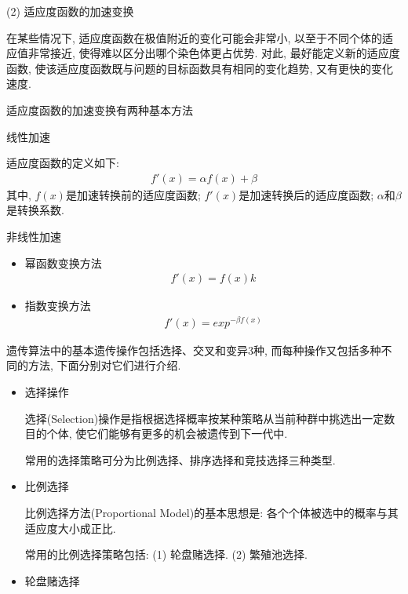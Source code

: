{(2) 适应度函数的加速变换

在某些情况下, 适应度函数在极值附近的变化可能会非常小, 以至于不同个体的适应值非常接近, 使得难以区分出哪个染色体更占优势. 对此, 最好能定义新的适应度函数, 使该适应度函数既与问题的目标函数具有相同的变化趋势, 又有更快的变化速度.

适应度函数的加速变换有两种基本方法

 线性加速

适应度函数的定义如下:
\begin{align}
  f'(x)=\alpha f(x)+\beta
\end{align}
其中, $f(x)$是加速转换前的适应度函数; $f'(x)$是加速转换后的适应度函数;  $\alpha$和$\beta$是转换系数.

  非线性加速
\begin{itemize}
\item 幂函数变换方法
   \begin{align}
        f'(x)=f(x)k
   \end{align}
\item 指数变换方法
         \begin{align}
            f'(x)=exp^{-\beta f(x)}
         \end{align}
\end{itemize}

遗传算法中的基本遗传操作包括选择、交叉和变异3种, 而每种操作又包括多种不同的方法, 下面分别对它们进行介绍.

\begin{itemize}
\item 选择操作

   选择(Selection)操作是指根据选择概率按某种策略从当前种群中挑选出一定数目的个体, 使它们能够有更多的机会被遗传到下一代中.

    常用的选择策略可分为比例选择、排序选择和竞技选择三种类型.

\item 比例选择

    比例选择方法(Proportional Model)的基本思想是: 各个个体被选中的概率与其适应度大小成正比.

    常用的比例选择策略包括: (1) 轮盘赌选择. (2) 繁殖池选择.

\item 轮盘赌选择


\end{itemize}}

